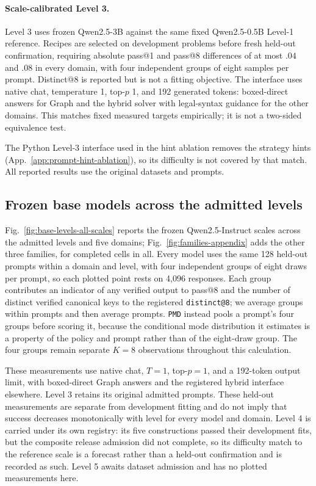 \documentclass{article}
\makeatletter
\newcommand{\1}{\mathbf 1}
\newcommand{\pmd}{\texttt{PMD}}
\newcommand{\distk}{\texttt{distinct@8}}
\theoremstyle{remark}
\theoremstyle{definition}
\theoremstyle{plain}
\makeatother
\begin{document}
\paragraph{Scale-calibrated Level 3.}
Level 3 uses frozen Qwen2.5-3B against the same fixed Qwen2.5-0.5B Level-1
reference. Recipes are selected on development problems before fresh held-out
confirmation, requiring absolute pass@1 and pass@8 differences of at most
$.04$ and $.08$ in every domain, with four independent groups of eight samples
per prompt. Distinct@8 is reported but is not a fitting objective. The
interface uses native chat, temperature 1, top-$p$ 1, and 192 generated
tokens: boxed-direct answers for Graph and the hybrid solver with
legal-syntax guidance for the other domains. This matches fixed measured
targets empirically; it is not a two-sided equivalence test.

The Python Level-3 interface used in the hint ablation removes the strategy
hints (App.~\ref{app:prompt-hint-ablation}), so its difficulty is not
covered by that match. All reported results use the original datasets and
prompts.

\subsection{Frozen base models across the admitted levels}
\label{app:base-levels-all-scales}

Fig.~\ref{fig:base-levels-all-scales} reports the frozen Qwen2.5-Instruct
scales across the admitted levels and five domains;
Fig.~\ref{fig:families-appendix} adds the other three families, for
\MDcells{} completed cells in all. Every model uses the same 128 held-out
prompts within a domain and level, with four independent groups of eight draws
per prompt, so each plotted point rests on 4,096 responses. Each group contributes an indicator
of any verified output to pass@8 and the number of distinct verified canonical
keys to the registered \distk{}; we average groups within prompts and then
average prompts. \pmd{} instead pools a prompt's four groups before scoring it,
because the conditional mode distribution it estimates is a property of the
policy and prompt rather than of the eight-draw group.
The four groups remain separate $K=8$ observations throughout this calculation.

These measurements use native chat, $T=1$, top-$p=1$, and a 192-token output
limit, with boxed-direct Graph answers and the registered hybrid interface
elsewhere. Level 3 retains its original admitted prompts. These held-out
measurements are separate from development fitting and do not imply that
success decreases monotonically with level for every model and domain.
Level 4 is carried under its own registry: its five constructions passed
their development fits, but the composite release admission did not complete,
so its difficulty match to the reference scale is a forecast rather than a
held-out confirmation and is recorded as such. Level 5 awaits dataset admission
and has no plotted measurements here.
\end{document}
